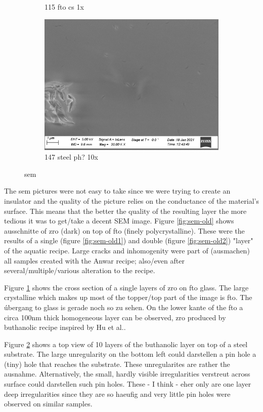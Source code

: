 \begin{figure}
\begin{subfigure}{.45\textwidth}
        \caption{115 fto cs 1x} \label{fig:sem-cs1}
    \end{subfigure}
    \begin{subfigure}{.45\textwidth}
        \centering
        \includegraphics[width=.8\textwidth]{Pics/sem/147_steel_ph_10x.png}
        \caption{147 steel ph? 10x} \label{fig:sem-ph}
    \end{subfigure}
    \caption{sem}
    \label{fig:sem}
\end{figure}

The \gls{sem} pictures were not easy to take since we were trying to create an insulator 
and the quality of the picture relies on the conductance of the material's surface. 
This means that the better the quality of the resulting layer the more tedious it was to get/take a decent SEM image. 
Figure \ref{fig:sem-old} shows ausschnitte of \gls{zro} (dark) on top of \gls{fto} (finely polycrystalline). 
These were the results of a single (figure \ref{fig:sem-old1}) and double (figure \ref{fig:sem-old2}) "layer" of the aquatic recipe. 
Large cracks and inhomogenity were part of (ausmachen) all samples created with the Anwar recipe; 
also/even after several/multiple/various alteration to the recipe. 

Figure \ref{fig:sem-cs1} shows the cross section of a single layers of \gls{zro} on \gls{fto} glass. 
The large crystalline  which makes up most of the topper/top part of the image is \gls{fto}. 
The úbergang to glass is gerade noch so zu sehen. 
On the lower kante of the \gls{fto} a circa 100nm thick homogeneous layer can be observed, \gls{zro} produced by buthanolic recipe inspired by Hu et al..

Figure \ref{fig:sem-ph} shows a top view of 10 layers of the buthanolic layer on top of a steel substrate. 
The large unregularity on the bottom left could darstellen a pin hole a (tiny) hole that reaches the substrate. 
These unregularites are rather the ausnahme. 
Alternatively, the small, hardly visible  irregularities verstreut across surface could darstellen such pin holes. 
These - I think - eher only are one layer deep irregularities since they are so haeufig 
and very little pin holes were observed on similar samples. 



